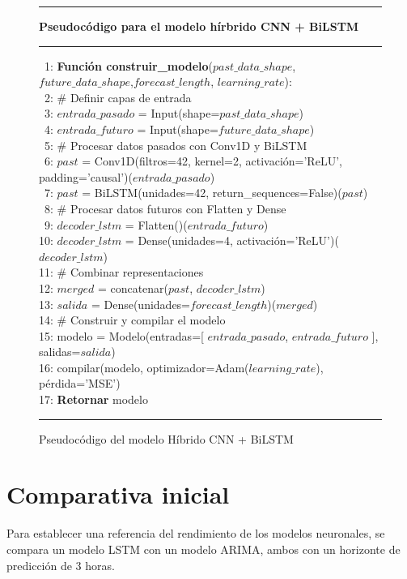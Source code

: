 \begin{figure}[H]
{\small
\hrule
{\bf\small Pseudocódigo para el modelo hírbrido CNN + BiLSTM}
\hrule
\begin{center}
\begin{tabbing}
\ 1: {\bf Fun}\= {\bf ción construir\_modelo}($past\_data\_shape$, $future\_data\_shape$,$forecast\_length$, $learning\_rate$): \\
\ 2: \> \# Definir capas de entrada \\
\ 3: \> $entrada\_pasado$ = Input(shape=$past\_data\_shape$) \\
\ 4: \> $entrada\_futuro$ = Input(shape=$future\_data\_shape$) \\
\ 5: \> \# Procesar datos pasados con Conv1D y BiLSTM \\
\ 6: \> $past$ = Conv1D(filtros=42, kernel=2, activación='ReLU', padding='causal')($entrada\_pasado$) \\
\ 7: \> $past$ = BiLSTM(unidades=42, return\_sequences=False)($past$) \\
\ 8: \> \# Procesar datos futuros con Flatten y Dense \\
\ 9: \> $decoder\_lstm$ = Flatten()($entrada\_futuro$) \\
10: \> $decoder\_lstm$ = Dense(unidades=4, activación='ReLU')($decoder\_lstm$) \\
11: \> \# Combinar representaciones \\
12: \> $merged$ = concatenar($past$, $decoder\_lstm$) \\
13: \> $salida$ = Dense(unidades=$forecast\_length$)($merged$) \\
14: \> \# Construir y compilar el modelo \\
15: \> modelo = Modelo(entradas=[ $entrada\_pasado$, $entrada\_futuro$ ], salidas=$salida$) \\
16: \> compilar(modelo, optimizador=Adam($learning\_rate$), pérdida='MSE') \\
17: \> {\bf Retornar} modelo \\
\end{tabbing}
\end{center}
}
\hrule
\caption{Pseudocódigo del modelo Híbrido CNN + BiLSTM}
\label{cnn_bilstm_model}
\end{figure}


\section{Comparativa inicial}
Para establecer una referencia del rendimiento de los modelos neuronales, se compara un modelo LSTM con un modelo ARIMA, ambos con un horizonte de predicción de 3 horas.

